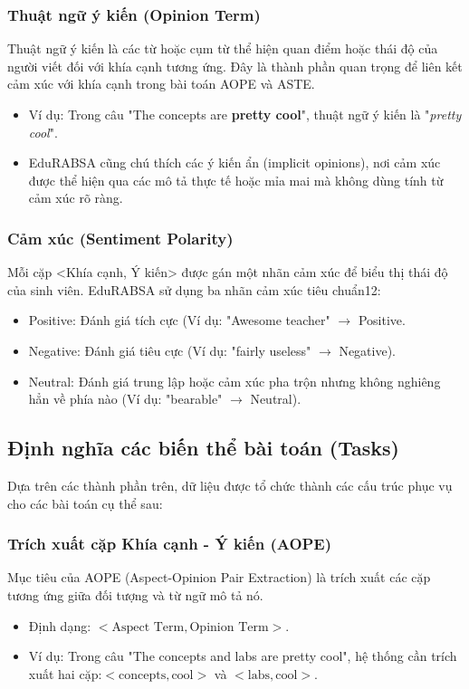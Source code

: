 \documentclass[12pt,a4paper]{report}
\begin{document}
\subsubsection{Thuật ngữ ý kiến (Opinion Term)} Thuật ngữ ý kiến là các từ hoặc cụm từ thể hiện quan điểm hoặc thái độ của người viết đối với khía cạnh tương ứng. Đây là thành phần quan trọng để liên kết cảm xúc với khía cạnh trong bài toán AOPE và ASTE. \begin{itemize} \item Ví dụ: Trong câu "The concepts are \textbf{pretty cool}", thuật ngữ ý kiến là "\textit{pretty cool}". \item EduRABSA cũng chú thích các ý kiến ẩn (implicit opinions), nơi cảm xúc được thể hiện qua các mô tả thực tế hoặc mỉa mai mà không dùng tính từ cảm xúc rõ ràng. \end{itemize}

\subsubsection{Cảm xúc (Sentiment Polarity)}
Mỗi cặp <Khía cạnh, Ý kiến> được gán một nhãn cảm xúc để biểu thị thái độ của sinh viên. EduRABSA sử dụng ba nhãn cảm xúc tiêu chuẩn12:
\begin{itemize}
\item Positive: Đánh giá tích cực (Ví dụ: "Awesome teacher" $\rightarrow$ Positive.
\item Negative: Đánh giá tiêu cực (Ví dụ: "fairly useless" $\rightarrow$ Negative).
\item Neutral: Đánh giá trung lập hoặc cảm xúc pha trộn nhưng không nghiêng hẳn về phía nào (Ví dụ: "bearable" $\rightarrow$ Neutral).
\end{itemize}

\subsection{Định nghĩa các biến thể bài toán (Tasks)}Dựa trên các thành phần trên, dữ liệu được tổ chức thành các cấu trúc phục vụ cho các bài toán cụ thể sau:
\subsubsection{Trích xuất cặp Khía cạnh - Ý kiến (AOPE)}Mục tiêu của AOPE (Aspect-Opinion Pair Extraction) là trích xuất các cặp tương ứng giữa đối tượng và từ ngữ mô tả nó.\begin{itemize}\item Định dạng: $< \text{Aspect Term}, \text{Opinion Term} >$.\item Ví dụ: Trong câu "The concepts and labs are pretty cool", hệ thống cần trích xuất hai cặp:$< \text{concepts}, \text{cool} >$ và $< \text{labs}, \text{cool} >$.\end{itemize}
\end{document}
